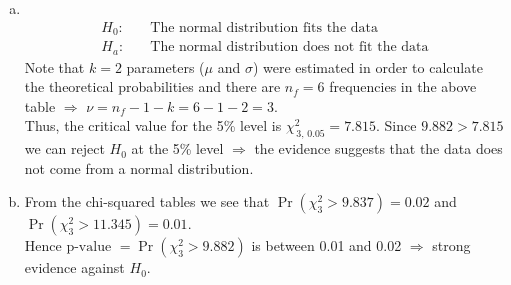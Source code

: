 \documentclass[12pt]{article}
\begin{document}
{\begin{minipage}[t]{0.98\textwidth}
\begin{enumerate}[a)]
\item \quad\\[-1.45cm]
\begin{align*}
H_0:& \quad \text{The normal distribution fits the data}\\[0.1cm]
H_a:& \quad \text{The normal distribution does not fit the data}
\end{align*}
Note that $k=2$ parameters ($\mu$ and $\sigma$) were estimated in order to calculate the theoretical probabilities and there are $n_f = 6$ frequencies in the above table $\Rightarrow$ $\nu = n_f - 1 -k = 6 - 1 - 2 = 3$.\\[0.2cm]
    Thus, the critical value for the 5\% level is $\chi^2_{\,3,\,0.05} = 7.815$. Since $9.882 > 7.815$ we can reject $H_0$ at the 5\% level $\Rightarrow$ the evidence suggests that the data does not come from a normal distribution.
\item From the chi-squared tables we see that $\Pr(\chi^2_3 > 9.837) = 0.02$ and  $\Pr(\chi^2_3 > 11.345) = 0.01$.\\[0.2cm]
     Hence $\text{p-value } = \Pr(\chi^2_3 > 9.882)$ is between 0.01 and 0.02 $\Rightarrow$ strong evidence against $H_0$.
\end{enumerate}
\end{minipage}}\vspace{0.03\textwidth}
\end{document}
